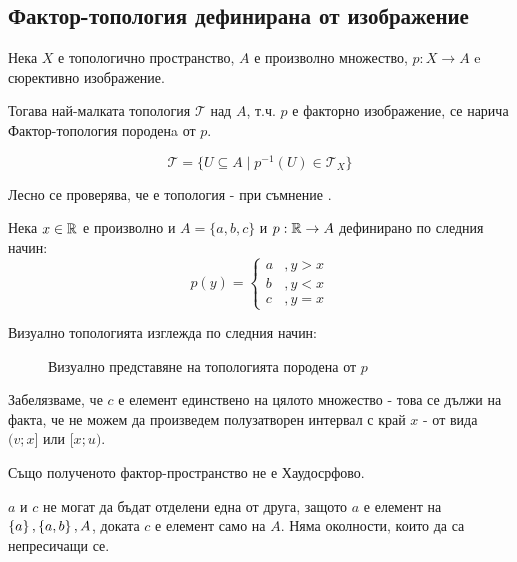 \subsection{Фактор-топология дефинирана от изображение}
\begin{definition}
    Нека $X$ е топологично пространство, $A$ е произволно множество, $p: X \to A$ e сюрективно изображение.

    Тогава най-малката топология $\mathcal T$ над $A$, т.ч. $p$ е факторно изображение, се нарича Фактор-топология породенa от $p$.

    \begin{equation}
        \mathcal T = \{U \subseteq A \mid p^{-1}(U) \in \mathcal T_X\}
    \end{equation}
\end{definition}
Лесно се проверява, че е топология - при съмнение \cite[стр.~138]{munkrestopology}.

\begin{example}
    Нека $x \in {\mathbb{R}}$ е произволно и $A = \{a, b, c\}$ и $p: {\mathbb{R}} \to A$ дефинирано по следния начин:
    \begin{equation}
        p(y) = \begin{cases}
            a &, y > x\\
            b &, y < x\\
            c &, y = x
        \end{cases}
    \end{equation}

    Визуално топологията изглежда по следния начин:
    \begin{figure}[H]
        \centering
        \caption{Визуално представяне на топологията породена от $p$}
    \end{figure}
    
    \begin{remark}
        Забелязваме, че $c$ е елемент единствено на цялото множество - това се дължи на факта, че не можем да произведем полузатворен интервал с край $x$ - от вида $(v; x]$ или $[x; u)$.
    \end{remark}
    
    \begin{remark}
        Също полученото фактор-пространство не е Хаудосрфово.

        $a$ и $c$ не могат да бъдат отделени една от друга, защото $a$ е елемент на $\left\{a\right\}, \left\{a, b\right\}, A$, доката $c$ е елемент само на $A$. Няма околности, които да са непресичащи се.
    \end{remark}
\end{example}

